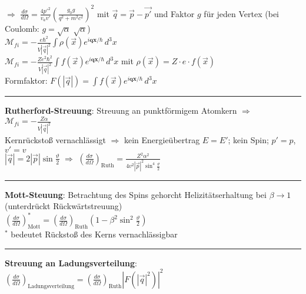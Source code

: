 \documentclass[10pt,twoside,a4paper]{article}
\begin{document}
\begin{multicols*}{3}
$\Rightarrow$ $\frac{d\sigma}{d\Omega} = \frac{4 p'^2}{v_a v'} \left( \frac{g_0 g}{q^2 + m^2 c^2} \right)^2$ mit $\vec{q} = \vec{p} - \vec{p'}$ und Faktor $g$ für jeden Vertex (bei Coulomb: $g = \sqrt{\alpha} \; \sqrt{\alpha}$) \\
$\mathcal{M}_{fi} = - \frac{e \hbar^2}{V \left| \vec{q} \right|^2} \int \rho\left( \vec{x} \right) e^{i \textbf{qx} / \hbar} \,d^3x$ \\
$\mathcal{M}_{fi} = - \frac{Z e^2 \hbar^2}{V \left| \vec{q} \right|^2} \int f\left( \vec{x} \right) e^{i \textbf{qx} / \hbar} \,d^3x$ mit $\rho\left( \vec{x} \right) = Z \cdot e \cdot f\left( \vec{x} \right)$ \\
Formfaktor: $F\left(\left|\vec{q}\right|\right) = \int f\left( \vec{x} \right) e^{i \textbf{qx} / \hbar} \,d^3x$
\\ \rule[0ex]{\columnwidth}{0.5pt}
\textbf{Rutherford-Streuung}: Streuung an punktförmigem Atomkern $\Rightarrow$ $\mathcal{M}_{fi} = - \frac{Z \alpha}{V \left| \vec{q} \right|^2}$ \\
Kernrückstoß vernachlässigt $\Rightarrow$ kein Energieübertrag $E = E'$; kein Spin; $p' = p$, $v' = v$ \\
$\left| \vec{q} \right| = 2 \left| \vec{p} \right| \sin \frac{\vartheta}{2}$ $\Rightarrow$ $\left( \frac{d\sigma}{d\Omega} \right)_{\text{Ruth}} = \frac{Z^2 \alpha^2}{4 v^2 \left| \vec{p} \right|^2 \sin^4 \frac{\vartheta}{2}}$
\\ \rule[0ex]{\columnwidth}{0.5pt}
\textbf{Mott-Steuung}: Betrachtung des Spins gehorcht Helizitätserhaltung bei $\beta \to 1$ (unterdrückt Rückwärtstreuung) \\
$\left( \frac{d\sigma}{d\Omega} \right)^{*}_{\text{Mott}} = \left( \frac{d\sigma}{d\Omega} \right)_{\text{Ruth}} \left( 1 - \beta^2 \sin^2 \frac{\vartheta}{2} \right)$ \\
$^{*}$ bedeutet Rückstoß des Kerns vernachlässigbar
\\ \rule[0ex]{\columnwidth}{0.5pt}
\textbf{Streuung an Ladungsverteilung}: \\
$\left( \frac{d\sigma}{d\Omega} \right)_{\text{Ladungsverteilung}} = \left( \frac{d\sigma}{d\Omega} \right)_{\text{Ruth}} \left| F\left( \left| \vec{q} \right|^2 \right) \right|^2$ \\

\end{multicols*}
\end{document}
